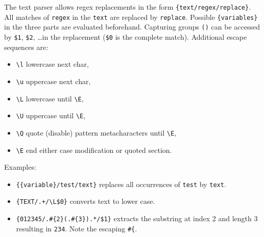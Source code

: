 The text parser allows regex replacements in the form \verb|{text/regex/replace}|.
All matches of \verb|regex| in the \verb|text| are replaced by \verb|replace|.
Possible \verb|{variables}| in the three parts are evaluated beforehand.
Capturing groups \verb|()| can be accessed by \verb|$1|, \verb|$2|,
\ldots in the replacement (\verb|$0| is the complete match). Additional escape sequences are:
\begin{itemize}
\item \verb|\l| lowercase next char,
\item \verb|\u| uppercase next char,
\item \verb|\L| lowercase until \verb|\E|,
\item \verb|\U| uppercase until \verb|\E|,
\item \verb|\Q| quote (disable) pattern metacharacters until \verb|\E|,
\item \verb|\E| end either case modification or quoted section.
\end{itemize}

Examples:
\begin{itemize}
\item \verb|{{variable}/test/text}| replaces all occurrences of \verb|test| by \verb|text|.
\item \verb|{TEXT/.+/\L$0}| converts text to lower case.
\item \verb|{012345/.#{2}(.#{3}).*/$1}| extracts the substring at index 2 and length 3 resulting in \verb|234|.
      Note the escaping \verb|#{|.
\end{itemize}

